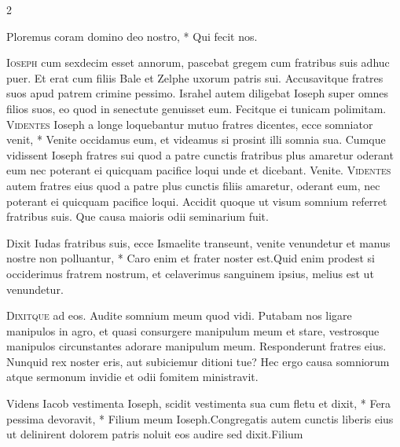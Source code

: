 \begin{multicols*}{2}
\begin{invitatory}
{Ploremus coram domino deo nostro, * Qui fecit nos.}
\end{invitatory}
\lettrine[lines=2]{\zallmancaps \color{Red} I}{oseph} cum sexdecim esset annorum, pascebat gregem cum fratribus suis adhuc puer. Et erat cum filiis Bale et Zelphe uxorum patris sui. Accusavitque fratres suos apud patrem crimine pessimo. Israhel autem diligebat Ioseph super omnes filios suos, eo quod in senectute genuisset eum. Fecitque ei tunicam polimitam. \R
\lettrine[lines=2]{\zallmancaps \color{Blue} V}{identes} \hypertarget{videntes-ioseph}{\label{videntes-ioseph}} Ioseph a longe loquebantur mutuo fratres dicentes, ecce somniator venit, * Venite occidamus eum, et videamus si prosint illi somnia sua. \V Cumque vidissent Ioseph fratres sui quod a patre cunctis fratribus plus amaretur oderant eum nec poterant ei quicquam pacifice loqui unde et dicebant. Venite.
\lettrine[lines=2]{\zallmancaps \color{Red} V}{identes} autem fratres eius quod a patre plus cunctis filiis amaretur, oderant eum, nec poterant ei quicquam pacifice loqui. Accidit quoque ut visum somnium referret fratribus suis. Que causa maioris odii seminarium fuit.
\begin{responsory}
{Dixit Iudas fratribus suis, ecce Ismaelite transeunt, venite venundetur et manus nostre non polluantur, * Caro enim et frater noster est.}{Quid enim prodest si occiderimus fratrem nostrum, et celaverimus sanguinem ipsius, melius est ut venundetur.}
\end{responsory}%
\lettrine[lines=2]{\zallmancaps \color{Blue} D}{ixitque} ad eos. Audite somnium meum quod vidi. Putabam nos ligare manipulos in agro, et quasi consurgere manipulum meum et stare, vestrosque manipulos circunstantes adorare manipulum meum. Responderunt fratres eius. Nunquid rex noster eris, aut subiciemur ditioni tue? Hec ergo causa somniorum atque sermonum invidie et odii fomitem ministravit.
\begin{responsory-final}
{Videns Iacob vestimenta Ioseph, scidit vestimenta sua cum fletu et dixit, * Fera pessima devoravit, * Filium meum Ioseph.}{Congregatis autem cunctis liberis eius ut delinirent dolorem patris noluit eos audire sed dixit.}{Filium}

\end{responsory-final}
\end{multicols*}
